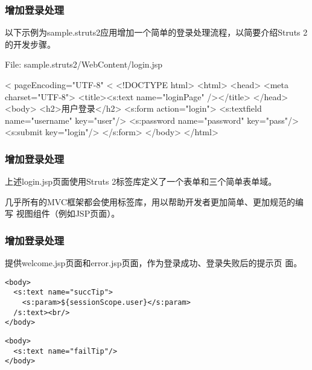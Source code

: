 \begin{frame}[fragile] %
\frametitle{增加登录处理}

以下示例为sample.struts2应用增加一个简单的登录处理流程，以简要介绍Struts 2的开发步骤。


File: sample.struts2/WebContent/login.jsp

\begin{xmlCode}
  <%
    pageEncoding="UTF-8"%
  <%
  <!DOCTYPE html>
  <html>
  <head>
    <meta charset="UTF-8">
    <title><s:text name="loginPage" /></title>
  </head>
  <body>
    <h2>用户登录</h2>
    <s:form action="login">
      <s:textfield name="username" key="user"/>
      <s:password name="password" key="pass"/>
      <s:submit key="login"/>
    </s:form>
  </body>
  </html>  
\end{xmlCode}
\end{frame}

\begin{frame}[fragile] %
\frametitle{增加登录处理}

上述login.jsp页面使用Struts 2标签库定义了一个表单和三个简单表单域。


几乎所有的MVC框架都会使用标签库，用以帮助开发者更加简单、更加规范的编写
视图组件（例如JSP页面）。


\end{frame}

\begin{frame}[fragile] %
\frametitle{增加登录处理}

提供welcome.jsp页面和error.jsp页面，作为登录成功、登录失败后的提示页
面。


{\footnotesize\Blue
\begin{verbatim}
<body>
  <s:text name="succTip">
    <s:param>${sessionScope.user}</s:param>
  /s:text><br/>
</body>
\end{verbatim}}


{\footnotesize\Blue
\begin{verbatim}
<body>
  <s:text name="failTip"/>
</body>
\end{verbatim}}
\end{frame}

